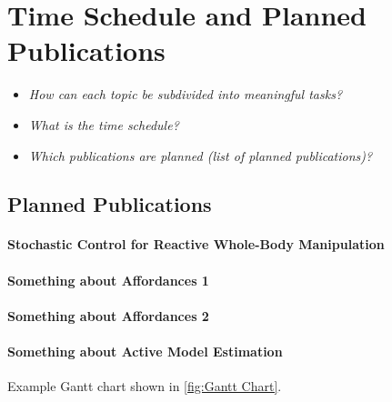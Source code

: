 \section{Time Schedule and Planned Publications}
\label{sec:time_schedule}

\begin{itemize}
   \item \emph{How can each topic be subdivided into meaningful tasks?}
	\item \emph{What is the time schedule?}
	\item \emph{Which publications are planned (list of planned publications)?}
\end{itemize}

\subsection{Planned Publications}
\paragraph{Stochastic Control for Reactive Whole-Body Manipulation}
\paragraph{Something about Affordances 1}
\paragraph{Something about Affordances 2}
\paragraph{Something about Active Model Estimation}


Example Gantt chart shown in \cref{fig:Gantt Chart}.

